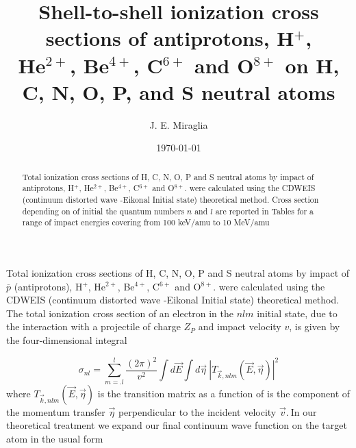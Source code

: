 \documentclass[preprint,showpacs,pra]{revtex4}
\begin{document}
\title{Shell-to-shell ionization cross sections of antiprotons, H$^{+}$,\\
He$^{2+}$, Be$^{4+}$, C$^{6+}$ and O$^{8+}$ on H, C, N, O, P, and S neutral
atoms}
\author{J. E. Miraglia}
\date{\today }

\begin{abstract}
Total ionization cross sections of H, C, N, O, P and S neutral atoms by
impact of antiprotons, H$^{+}$, He$^{2+}$, Be$^{4+}$, C$^{6+}$ and O$^{8+}$.
were calculated using the CDWEIS (continuum distorted wave -Eikonal Initial
state) theoretical method. Cross section depending on of initial the quantum
numbers $n$ and $l$ are reported in Tables for a range of impact energies
covering from 100 keV/amu to 10 MeV/amu
\end{abstract}

\pacs{ }
\maketitle

Total ionization cross sections of H, C, N, O, P and S neutral atoms by
impact of $\overline{p}$ (antiprotons), H$^{+}$, He$^{2+}$, Be$^{4+}$, C$%
^{6+}$ and O$^{8+}$. were calculated using the CDWEIS (continuum distorted
wave -Eikonal Initial state) theoretical method. The total ionization cross
section of an electron in the $nlm$ initial state, due to the interaction
with a projectile of charge $Z_{P}$ and impact velocity $v$, is given by the
four-dimensional integral

\begin{equation}
\sigma _{nl}=\sum_{m=.l}^{l}\frac{(2\pi )^{2}}{v^{2}}\int d\overrightarrow{E}%
\int d\overrightarrow{\eta }\ \left\vert T_{\overrightarrow{k},nlm}(%
\overrightarrow{E},\overrightarrow{\eta })\right\vert ^{2}  \label{1}
\end{equation}%
where $T_{\overrightarrow{k},nlm}(\overrightarrow{E},\overrightarrow{\eta })$
is the transition matrix as a function of is the component of the momentum
transfer $\overrightarrow{\eta }$ perpendicular to the incident velocity $%
\vec{v}.\ $In our theoretical treatment we expand our final continuum wave
function on the target atom in the usual form
\end{document}
